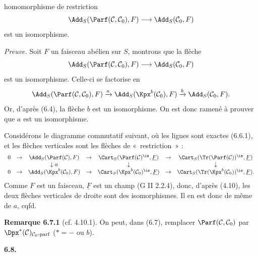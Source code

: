 homomorphisme de restriction
\[
  \Add_S(\Parf(\mathcal C,\mathcal C_0),F)
  \longrightarrow
  \Add_S(\mathcal C_0,F)
\]
est un isomorphisme.

\emph{Preuve.} Soit \(F\) un faisceau abélien sur \(S\), montrons que la flèche
\[
  \Add_S(\Parf(\mathcal C,\mathcal C_0),F)
  \longrightarrow
  \Add_S(\mathcal C_0,F)
\]
est un isomorphisme. Celle-ci se factorise en
\[
\Add_S(\Parf(\mathcal C,\mathcal C_0),F)
 \xrightarrow{a}
\Add_S(\Kpx^b(\mathcal C_0),F)
 \xrightarrow{b}
\Add_S(\mathcal C_0,F).
\]
Or, d'après (6.4), la flèche \(b\) est un isomorphisme. On est donc ramené à prouver que \(a\) est un isomorphisme.

Considérons le diagramme commutatif suivant, où les lignes sont exactes (6.6.1), et les flèches verticales sont les flèches de «~restriction~» :
\[
\begin{array}{ccccccccc}
0&\to&\Add_S(\Parf(\mathcal C),F)&\to&\Cart_S(\Parf(\mathcal C)^{\is},\underline F)&\to&\Cart_S(\Tr(\Parf(\mathcal C))^{\is},\underline F)\\
&&\downarrow a&&\downarrow&&\downarrow\\
0&\to&\Add_S(\Kpx^b(\mathcal C_0),F)&\to&\Cart_S(\Kpx^b(\mathcal C_0)^{\is},\underline F)&\to&\Cart_S(\Tr(\Kpx^b(\mathcal C_0))^{\is},\underline F).
\end{array}
\]
Comme \(F\) est un faisceau, \(\underline F\) est un champ (G II 2.2.4), donc, d'après (4.10), les deux flèches verticales de droite sont des isomorphismes. Il en est donc de même de \(a\), cqfd.

\textbf{Remarque 6.7.1} (cf. 4.10.1). On peut, dans (6.7), remplacer \(\Parf(\mathcal C,\mathcal C_0)\) par \(\Dpx^*(\mathcal C)_{\mathcal C_0\text{-}\mathrm{parf}}\) (\(*=-\) ou \(b\)).

\textbf{6.8.}
